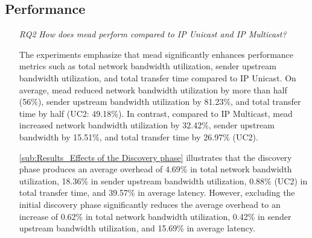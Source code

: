 \subsection{Performance} %
\label{sub:discussion_Performance}
\begin{itemize}
\item[\textit{RQ2}]
    \textit{How does \gls{mead} perform compared to IP Unicast and IP Multicast?}
    

        The experiments emphasize that \gls{mead} significantly enhances performance
        metrics such as total network bandwidth utilization, sender upstream
        bandwidth utilization, and total transfer time compared to IP Unicast.
    On average, \gls{mead} reduced network bandwidth utilization by more than
        half (56\%), sender upstream bandwidth utilization by 81.23\%, and
        total transfer time by half (UC2: 49.18\%).
    In contrast, compared to IP Multicast, \gls{mead} increased network bandwidth
        utilization by 32.42\%, sender upstream bandwidth by 15.51\%, and total
        transfer time by 26.97\% (UC2).

    \autoref{sub:Results_Effects of the Discovery phase} illustrates that the discovery
        phase produces an average overhead of 4.69\% in total network bandwidth
        utilization, 18.36\% in sender upstream bandwidth utilization, 0.88\%
        (UC2) in total transfer time, and 39.57\% in average latency.
    However, excluding the initial discovery phase significantly reduces the 
        average overhead to an increase of 0.62\% in total network bandwidth
        utilization, 0.42\% in sender upstream bandwidth utilization, and
        15.69\% in average latency.


\end{itemize}
